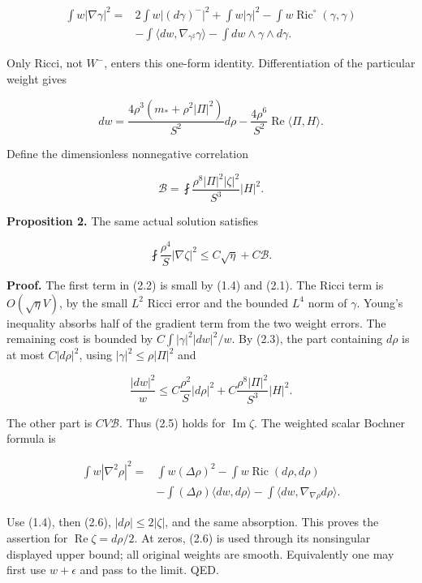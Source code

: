 \documentclass[
  10pt,
]{article}
\begin{document}
\[
\begin{aligned}
 \int w|\nabla\gamma|^2={}&2\int w|(d\gamma)^-|^2+
 \int w|\gamma|^2-\int w\operatorname{Ric}^{\circ}(\gamma,\gamma)\\
 &-\int\langle dw,\nabla_{\gamma^\sharp}\gamma\rangle
   -\int dw\wedge\gamma\wedge d\gamma.
\end{aligned}
 \tag{2.2}
\]

Only Ricci, not \(W^-\), enters this one-form identity. Differentiation
of the particular weight gives

\[
 dw=\frac{4\rho^3(m_*+\rho^2|\Pi|^2)}{S^2}d\rho
       -\frac{4\rho^6}{S^2}\operatorname{Re}\langle\Pi,H\rangle.
 \tag{2.3}
\]

Define the dimensionless nonnegative correlation

\[
 \mathcal B=\fint
       \frac{\rho^8|\Pi|^2|\zeta|^2}{S^3}|H|^2.
 \tag{2.4}
\]

\textbf{Proposition 2.} The same actual solution satisfies

\[
 \boxed{\fint \frac{\rho^4}{S}|\nabla\zeta|^2
                         \le C\sqrt\eta+C\mathcal B.}
 \tag{2.5}
\]

\textbf{Proof.} The first term in (2.2) is small by (1.4) and (2.1). The
Ricci term is \(O(\sqrt\eta V)\), by the small \(L^2\) Ricci error and
the bounded \(L^4\) norm of \(\gamma\). Young's inequality absorbs half
of the gradient term from the two weight errors. The remaining cost is
bounded by \(C\int |\gamma|^2|dw|^2/w\). By (2.3), the part containing
\(d\rho\) is at most \(C|d\rho|^2\), using \(|\gamma|^2\le\rho|\Pi|^2\)
and

\[
 \frac{|dw|^2}{w}
 \le C\frac{\rho^2}{S}|d\rho|^2
       +C\frac{\rho^8|\Pi|^2}{S^3}|H|^2.
 \tag{2.6}
\]

The other part is \(C V\mathcal B\). Thus (2.5) holds for
\(\operatorname{Im}\zeta\). The weighted scalar Bochner formula is

\[
\begin{aligned}
 \int w|\nabla^2\rho|^2={}&\int w(\Delta\rho)^2
  -\int w\operatorname{Ric}(d\rho,d\rho)\\
 &-\int(\Delta\rho)\langle dw,d\rho\rangle
  -\int\langle dw,\nabla_{\nabla\rho}d\rho\rangle.
\end{aligned}
 \tag{2.7}
\]

Use (1.4), then (2.6), \(|d\rho|\le2|\zeta|\), and the same absorption.
This proves the assertion for \(\operatorname{Re}\zeta=d\rho/2\). At
zeros, (2.6) is used through its nonsingular displayed upper bound; all
original weights are smooth. Equivalently one may first use
\(w+\epsilon\) and pass to the limit. QED.
\end{document}
